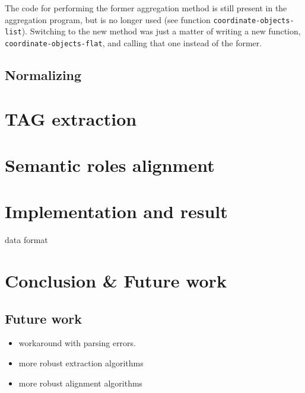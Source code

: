 \documentclass[a4paper]{article}
\begin{document}
The code for performing the former aggregation method is still present
in the aggregation program, but is no longer used (see function
\texttt{coordinate-objects-list}). Switching to the new method was
just a matter of writing a new function,
\texttt{coordinate-objects-flat}, and calling that one instead of the
former.

\subsection{Normalizing}



\section{TAG extraction}
\section{Semantic roles alignment}
\section{Implementation and result}
data format
\section{Conclusion \& Future work}
\subsection{Future work}
\begin{itemize}
    \item workaround with parsing errors.
    \item more robust extraction algorithms
    \item more robust alignment algorithms
\end{itemize}
\end{document}

